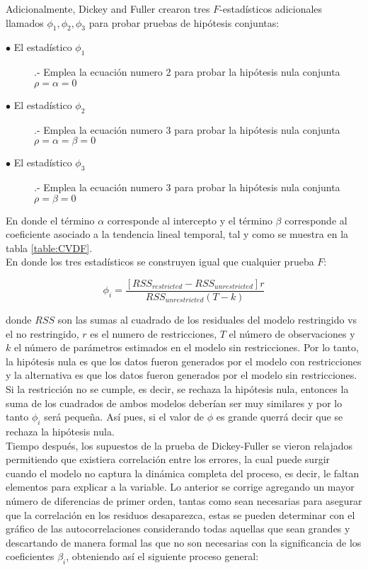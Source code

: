 Adicionalmente, Dickey and Fuller crearon tres $F$-estadísticos adicionales llamados $\phi_1,\phi_2,\phi_3$ para probar pruebas de hipótesis conjuntas:

\begin{description}
  \item [$\bullet$ El estadístico $\phi_1$] .- Emplea la ecuación numero 2 para probar la hipótesis nula conjunta $\rho=\alpha=0$
  \item [$\bullet$ El estadístico $\phi_2$] .- Emplea la ecuación numero 3 para probar la hipótesis nula conjunta $\rho=\alpha=\beta=0$
  \item [$\bullet$ El estadístico $\phi_3$] .- Emplea la ecuación numero 3 para probar la hipótesis nula conjunta $\rho=\beta=0$
\end{description}

En donde el término $\alpha$ corresponde al intercepto y el término $\beta$ corresponde al coeficiente asociado a la tendencia lineal temporal, tal y como se muestra en la tabla \ref{table:CVDF}.\\


En donde los tres estadísticos se construyen igual que cualquier prueba $F$:

$$ \phi_i = \frac{[RSS_{restricted}-RSS_{unrestricted}]r}{RSS_{unrestricted}(T-k)}$$

donde $RSS$ son las sumas al cuadrado de los residuales del modelo restringido vs el no restringido, $r$ es el numero de restricciones, $T$ el número de observaciones y $k$ el número de parámetros estimados en el modelo sin restricciones. Por lo tanto, la hipótesis nula es que los datos fueron generados por el modelo con restricciones y la alternativa es que los datos fueron generados por el modelo sin restricciones. Si la restricción no se cumple, es decir, se rechaza la hipótesis nula, entonces la suma de los cuadrados de ambos modelos deberían ser muy similares y por lo tanto $\phi_i$ será pequeña. Así pues, si el valor de $\phi$ es grande querrá decir que se rechaza la hipótesis nula.\\


Tiempo después, los supuestos de la prueba de Dickey-Fuller se vieron relajados permitiendo que existiera correlación entre los errores, la cual puede surgir cuando el modelo no captura la dinámica completa del proceso, es decir, le faltan elementos para explicar a la variable. Lo anterior se corrige agregando un mayor número de diferencias de primer orden, tantas como sean necesarias para asegurar que la correlación en los residuos desaparezca, estas  se pueden determinar con el gráfico de las autocorrelaciones considerando todas aquellas que sean grandes y descartando de manera formal las que no son necesarias con la significancia de los coeficientes  $\beta_i$, obteniendo así el siguiente proceso general:

